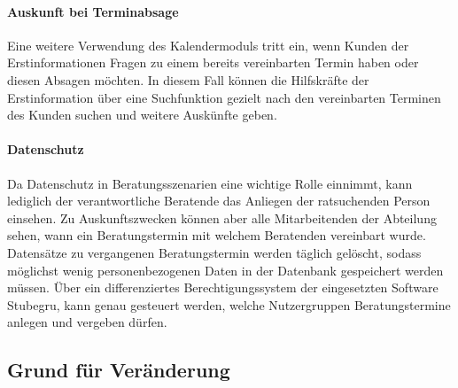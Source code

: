 \documentclass[12pt]{article}
\begin{document}
\paragraph{Auskunft bei Terminabsage}
Eine weitere Verwendung des Kalendermoduls tritt ein, wenn Kunden der
Erstinformationen Fragen zu einem bereits vereinbarten Termin haben oder diesen
Absagen möchten. In diesem Fall können die Hilfskräfte der Erstinformation über
eine Suchfunktion gezielt nach den vereinbarten Terminen des Kunden suchen und
weitere Auskünfte geben.

\paragraph{Datenschutz}
Da Datenschutz in Beratungsszenarien eine wichtige Rolle einnimmt, kann
lediglich der verantwortliche Beratende das Anliegen der ratsuchenden Person
einsehen. Zu Auskunftszwecken können aber alle Mitarbeitenden der Abteilung
sehen, wann ein Beratungstermin mit welchem Beratenden vereinbart wurde.
Datensätze zu vergangenen Beratungstermin werden täglich gelöscht, sodass
möglichst wenig personenbezogenen Daten in der Datenbank gespeichert werden
müssen. Über ein differenziertes Berechtigungssystem der eingesetzten Software
Stubegru, kann genau gesteuert werden, welche Nutzergruppen Beratungstermine
anlegen und vergeben dürfen.

\subsection{Grund für Veränderung}
\end{document}
